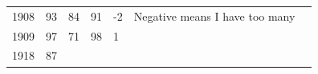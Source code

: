 \documentclass[12pt,]{article}
\theoremstyle{definition}
\theoremstyle{definition}
\theoremstyle{definition}
\theoremstyle{remark}
\begin{document}
\begin{longtable}[]{@{}lllllll@{}}
\begin{minipage}[t]{0.02\columnwidth}\raggedright\strut
1908\strut
\end{minipage} & \begin{minipage}[t]{0.09\columnwidth}\raggedright\strut
93\strut
\end{minipage} & \begin{minipage}[t]{0.10\columnwidth}\raggedright\strut
84\strut
\end{minipage} & \begin{minipage}[t]{0.10\columnwidth}\raggedright\strut
91\strut
\end{minipage} & \begin{minipage}[t]{0.07\columnwidth}\raggedright\strut
-2\strut
\end{minipage} & \begin{minipage}[t]{0.11\columnwidth}\raggedright\strut
Negative means I have too many\strut
\end{minipage} & \begin{minipage}[t]{0.31\columnwidth}\raggedright\strut
\strut
\end{minipage}\tabularnewline
\begin{minipage}[t]{0.02\columnwidth}\raggedright\strut
1909\strut
\end{minipage} & \begin{minipage}[t]{0.09\columnwidth}\raggedright\strut
97\strut
\end{minipage} & \begin{minipage}[t]{0.10\columnwidth}\raggedright\strut
71\strut
\end{minipage} & \begin{minipage}[t]{0.10\columnwidth}\raggedright\strut
98\strut
\end{minipage} & \begin{minipage}[t]{0.07\columnwidth}\raggedright\strut
1\strut
\end{minipage} & \begin{minipage}[t]{0.11\columnwidth}\raggedright\strut
\strut
\end{minipage} & \begin{minipage}[t]{0.31\columnwidth}\raggedright\strut
\strut
\end{minipage}\tabularnewline
\begin{minipage}[t]{0.02\columnwidth}\raggedright\strut
1918\strut
\end{minipage} & \begin{minipage}[t]{0.09\columnwidth}\raggedright\strut
87\strut
\end{minipage} & \begin{minipage}[t]{0.10\columnwidth}\raggedright\strut

\end{minipage}
\end{longtable}
\end{document}
